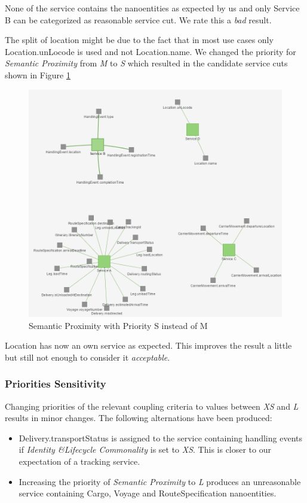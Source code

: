 None of the service contains the nanoentities as expected by us and only Service B can be categorized as reasonable service cut. We rate this a \textit{bad} result. 

The split of location might be due to the fact that in most use cases only Location.unLocode is used and not Location.name. We changed the priority for \textit{Semantic Proximity} from \textit{M} to \textit{S} which resulted in the candidate service cuts shown in Figure \ref{fig:dddGirvanNewmanS}

\begin{figure}[H]
	\includegraphics[scale=0.7]{images/ddd_girvan_4_proximity_s.png}
	\caption{Semantic Proximity with Priority S instead of M}
	\label{fig:dddGirvanNewmanS}
\end{figure}

Location has now an own service as expected. This improves the result a little but still not enough to consider it \textit{acceptable}.

\subsubsection{Priorities Sensitivity}

Changing priorities of the relevant coupling criteria to values between \textit{XS} and \textit{L} results in minor changes. The following alternations have been produced:

\begin{itemize}
	\item Delivery.transportStatus is assigned to the service containing handling events if \textit{Identity \&Lifecycle Commonality} is set to \textit{XS}. This is closer to our expectation of a tracking service.
	\item Increasing the priority of \textit{Semantic Proximity} to \textit{L} produces an unreasonable service containing Cargo, Voyage and RouteSpecification nanoentities.
\end{itemize}

